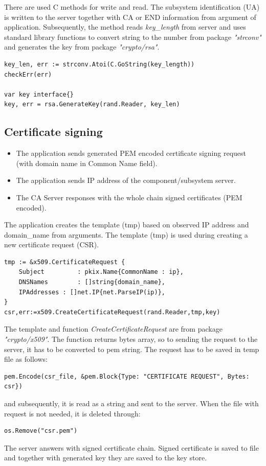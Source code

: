 \documentclass[
  digital, %
  notable,   %
  lof,     %
  lot,     %
]{fithesis3}
\begin{document}
There are used C methods for write and read. The subsystem identification (UA) is written to the 
server together with CA or END information from argument of application. Subsequently, the method 
reads \textit{key\_length} from server and uses standard library functions to convert string to the 
number from package \textit{"strconv"} and generates the key from package \textit{"crypto/rsa"}.

\begin{lstlisting}
key_len, err := strconv.Atoi(C.GoString(key_length))	
checkErr(err)

var key interface{}
key, err = rsa.GenerateKey(rand.Reader, key_len)
\end{lstlisting}
    
\subsection{Certificate signing}
\begin{itemize}[leftmargin=2em,rightmargin=1em,itemsep=0.75\parskip,parsep=0em,topsep=0em,partopsep=0em]
\item The application sends generated PEM encoded certificate signing request (with domain name in Common Name field).
\item The application sends IP address of the component/subsystem server.
\item The CA Server responses with the whole chain signed certificates (PEM encoded).
\end{itemize}

The application creates the template (tmp) based on observed IP address and domain\_name from 
arguments. The template (tmp) is used during creating a new certificate request (CSR). 

\begin{lstlisting}
tmp := &x509.CertificateRequest {
	Subject 		: pkix.Name{CommonName : ip},
	DNSNames 		: []string{domain_name},
	IPAddresses : []net.IP{net.ParseIP(ip)},
}
csr,err:=x509.CreateCertificateRequest(rand.Reader,tmp,key)
\end{lstlisting}

The template and function \textit{CreateCertificateRequest} are from package 
\textit{"crypto/x509"}. The function returns bytes array, so to sending the request to the server, 
it has to be converted to pem string. The request has to be saved in temp file as follows:
\begin{lstlisting}
pem.Encode(csr_file, &pem.Block{Type: "CERTIFICATE REQUEST", Bytes: csr})
\end{lstlisting}
and subsequently, it is read as a string and sent to the server. When the file with request is not 
needed, it is deleted through:
\begin{lstlisting}
os.Remove("csr.pem")
\end{lstlisting}
The server answers with signed certificate chain. Signed certificate is saved to file and together 
with generated key they are saved to the key store.
\end{document}
